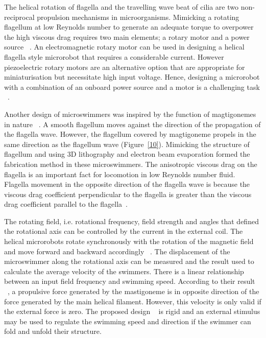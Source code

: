 \documentclass[12pt,a4paper,titlepage]{report}
\begin{document}
The helical rotation of flagella and the travelling wave beat of cilia are two non-reciprocal propulsion
 mechanisms in microorganisms. Mimicking a rotating flagellum at low Reynolds number to generate an 
adequate torque to overpower the high viscous drag requires two main elements; a rotary motor and a
 power source ~\citep{qiunanohelices}. 
An electromagnetic rotary motor can be used in designing a helical flagella style microrobot that 
requires a considerable current. However piezoelectric rotary motors are an alternative option 
that are appropriate for miniaturisation but necessitate high input voltage.  Hence, designing a microrobot with a 
combination of an onboard power source and a motor is a challenging task ~\citep{qiunanohelices}.

Another design of microswimmers was inspired by the function of magtigonemes in nature ~\citep{tottori2013artificial}.
 A smooth flagellum moves against the direction of the propagation of the flagella wave. However, 
the flagellum covered by magtigoneme propels in the same direction as the flagellum wave (Figure~\ref{10}). Mimicking 
the structure of flagellum and using 3D lithography and electron beam evaporation formed the fabrication 
method in these microswimmers.
The anisotropic viscous drag on the flagella is an important fact for locomotion in low Reynolds number fluid. 
Flagella movement in the opposite direction of the flagella wave is because the 
viscous drag coefficient perpendicular to the flagella is greater than the viscous drag coefficient parallel to 
the flagella~\citep{tottori2013artificial}. 

 The rotating field, i.e. rotational frequency, field strength and angles that 
defined the rotational axis can be controlled by the current in the external coil. The helical microrobots rotate 
synchronously with the rotation of the magnetic field and move forward and backward accordingly ~\citep{tottori2013artificial}. 
The displacement of the microswimmer along the rotational axis can be measured and the result 
used to calculate the average velocity of the swimmers. There is a linear relationship between an input 
field frequency and swimming speed. According to their result ~\citep{tottori2013artificial}, a propulsive force generated by 
the mastigoneme is in opposite direction of the force generated by the main helical filament. 
However, this velocity is only valid if the external force is zero. The proposed 
design ~\citep{tottori2013artificial} is rigid and an external stimulus may be used to regulate the swimming
 speed and direction if the swimmer can fold and unfold their structure. 
\end{document}
